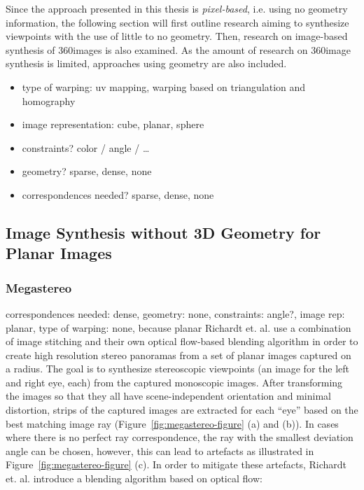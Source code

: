 Since the approach presented in this thesis is \emph{pixel-based}, i.e. using no geometry information, the following section will first outline research aiming to synthesize viewpoints with the use of little to no geometry. Then, research on image-based synthesis of 360\degree images is also examined. As the amount of research on 360\degree image synthesis is limited, approaches using geometry are also included.

\begin{itemize}
  \item type of warping: uv mapping, warping based on triangulation and homography
  \item image representation: cube, planar, sphere
  \item constraints? color / angle / \ldots
  \item geometry? sparse, dense, none
  \item correspondences needed? sparse, dense, none
\end{itemize}

\subsection{Image Synthesis without 3D Geometry for Planar Images}

\subsubsection{Megastereo \label{megastereo}}
correspondences needed: dense, geometry: none, constraints: angle?, image rep: planar, type of warping: none, because planar
Richardt et. al. \cite{megastereo} use a combination of image stitching and their own optical flow-based blending algorithm in order to create high resolution stereo panoramas from a set of planar images captured on a radius. The goal is to synthesize stereoscopic viewpoints (an image for the left and right eye, each) from the captured monoscopic images. After transforming the images so that they all have scene-independent orientation and minimal distortion, strips of the captured images are extracted for each ``eye'' based on the best matching image ray (Figure~\ref{fig:megastereo-figure} (a) and (b)). In cases where there is no perfect ray correspondence, the ray with the smallest deviation angle can be chosen, however, this can lead to artefacts as illustrated in Figure~\ref{fig:megastereo-figure} (c). In order to mitigate these artefacts, Richardt et. al. introduce a blending algorithm based on optical flow: 

